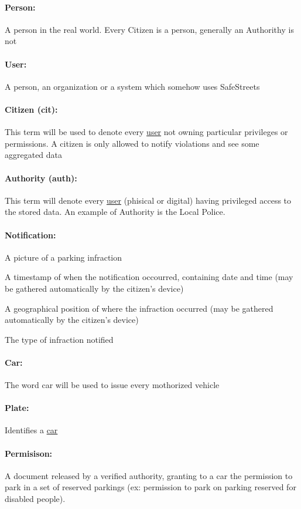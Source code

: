 \documentclass{article}
\begin{document}
		\paragraph{Person:}A person in the real world. Every Citizen is a person, generally an Authorithy is not
		\paragraph{User:}A person, an organization or a system which somehow uses SafeStreets
		\paragraph{Citizen (cit):} This term will be used to denote every \underline{user} not owning particular privileges or permissions. A citizen is only allowed to notify violations and see some aggregated data
		\paragraph{Authority (auth):} This term will denote every \underline{user} (phisical or digital) having privileged access to the stored data. An example of Authority is the Local Police.
		\paragraph{Notification:} 
			\begin{list}{-}{Represents a set of data submitted by any user composed by:}
				\item A picture of a parking infraction
				\item A timestamp of when the notification occourred, containing date and time (may be gathered automatically by the citizen's device)
				\item A geographical position of where the infraction occurred (may be gathered automatically by the citizen's device)
				\item The type of infraction notified
			\end{list}
		\paragraph{Car:}The word car will be used to issue every mothorized vehicle
		\paragraph{Plate:}Identifies a \underline{car}
		\paragraph{Permisison:}A document released by a verified authority, granting to a car the permission to park in a set of reserved parkings (ex: permission to park on parking reserved for disabled people). 
		
\end{document}
